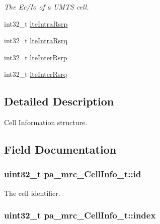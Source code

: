 \begin{DoxyCompactItemize}
\begin{DoxyCompactList}\small\item\em The Ec/\+Io of a U\+M\+TS cell. \end{DoxyCompactList}\item 
int32\+\_\+t \hyperlink{structpa__mrc___cell_info__t_a1ff358d29c84bc1a5cd9e93a2a401953}{lte\+Intra\+Rsrp}
\item 
int32\+\_\+t \hyperlink{structpa__mrc___cell_info__t_aaec06f09b0a131ce899b7c6e61c4ea9a}{lte\+Intra\+Rsrq}
\item 
int32\+\_\+t \hyperlink{structpa__mrc___cell_info__t_ae576686e484eb2beed1c2c439e31221e}{lte\+Inter\+Rsrp}
\item 
int32\+\_\+t \hyperlink{structpa__mrc___cell_info__t_a914938f4108362effb39b3c56e24a339}{lte\+Inter\+Rsrq}
\end{DoxyCompactItemize}


\subsection{Detailed Description}
Cell Information structure. 

\subsection{Field Documentation}
\subsubsection[{\texorpdfstring{id}{id}}]{\setlength{\rightskip}{0pt plus 5cm}uint32\+\_\+t pa\+\_\+mrc\+\_\+\+Cell\+Info\+\_\+t\+::id}\hypertarget{structpa__mrc___cell_info__t_a59745bebda0ea8d569f5bf634c9f446a}{}\label{structpa__mrc___cell_info__t_a59745bebda0ea8d569f5bf634c9f446a}


The cell identifier. 

\subsubsection[{\texorpdfstring{index}{index}}]{\setlength{\rightskip}{0pt plus 5cm}uint32\+\_\+t pa\+\_\+mrc\+\_\+\+Cell\+Info\+\_\+t\+::index}\hypertarget{structpa__mrc___cell_info__t_ad5be783113c7b4f8f90582279c5a6dfb}{}\label{structpa__mrc___cell_info__t_ad5be783113c7b4f8f90582279c5a6dfb}


